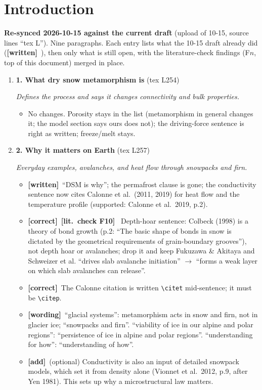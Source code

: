 \documentclass[11pt]{article}
\newcommand{\Have}{\textcolor{have}{\textbf{[written]}}\ }
\newcommand{\Pg}[3]{\item \textbf{#1} {\small(#2)}\par\textit{#3}}
\newcommand{\tC}{\textcolor{miss}{\textbf{[correct]}}\ }
\newcommand{\tG}{\textcolor{stale}{\textbf{[wording]}}\ }
\newcommand{\tA}{\textcolor{have}{\textbf{[add]}}\ }
\newcommand{\Chk}[1]{\textcolor{chk}{\textbf{[lit.\ check #1]}}\ }
\begin{document}
\section{Introduction}
\textbf{Re-synced 2026-10-15 against the current draft} (upload of 10-15,
source lines ``tex L''). Nine paragraphs. Each entry lists what the 10-15
draft already did (\Have), then only what is still open, with the
literature-check findings (F$n$, top of this document) merged in place.
\begin{enumerate}
\Pg{1. What dry snow metamorphism is}{tex L254}{Defines the process and says it changes connectivity and bulk properties.}
  \begin{itemize}
  \item No changes. Porosity stays in the list (metamorphism in general
    changes it; the model section says ours does not); the driving-force
    sentence is right as written; freeze/melt stays.
  \end{itemize}
\Pg{2. Why it matters on Earth}{tex L257}{Everyday examples, avalanches, and heat flow through snowpacks and firn.}
  \begin{itemize}
  \item \Have ``DSM is why''; the permafrost clause is gone; the
    conductivity sentence now cites Calonne et al.\ (2011, 2019) for heat
    flow and the temperature profile (supported: Calonne et al.\ 2019, p.2).
  \item \tC \Chk{F10} Depth-hoar sentence: Colbeck (1998) is a theory of bond
    growth (p.2: ``The basic shape of bonds in snow is dictated by the
    geometrical requirements of grain-boundary grooves''), not depth hoar or
    avalanches; drop it and keep Fukuzawa \& Akitaya and Schweizer et al.
    ``drives slab avalanche initiation'' $\to$ ``forms a weak layer on which
    slab avalanches can release''.
  \item \tC The Calonne citation is written \texttt{\textbackslash citet}
    mid-sentence; it must be \texttt{\textbackslash citep}.
  \item \tG ``glacial systems'': metamorphism acts in snow and firn, not in
    glacier ice; ``snowpacks and firn''. ``viability of ice in our alpine and
    polar regions'': ``persistence of ice in alpine and polar regions''.
    ``understanding for how'': ``understanding of how''.
  \item \tA (optional) Conductivity is also an input of detailed snowpack
    models, which set it from density alone (Vionnet et al.\ 2012, p.9,
    after Yen 1981). This sets up why a microstructural law matters.

\end{itemize}
\end{enumerate}
\end{document}
